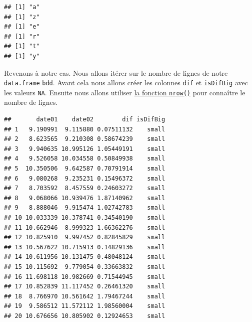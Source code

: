\documentclass[]{book}
\newenvironment{Shaded}{\begin{snugshade}}{\end{snugshade}}
\newcommand{\ControlFlowTok}[1]{\textcolor[rgb]{0.13,0.29,0.53}{\textbf{#1}}}
\newcommand{\DataTypeTok}[1]{\textcolor[rgb]{0.13,0.29,0.53}{#1}}
\newcommand{\DecValTok}[1]{\textcolor[rgb]{0.00,0.00,0.81}{#1}}
\newcommand{\KeywordTok}[1]{\textcolor[rgb]{0.13,0.29,0.53}{\textbf{#1}}}
\newcommand{\NormalTok}[1]{#1}
\newcommand{\OperatorTok}[1]{\textcolor[rgb]{0.81,0.36,0.00}{\textbf{#1}}}
\newcommand{\OtherTok}[1]{\textcolor[rgb]{0.56,0.35,0.01}{#1}}
\newcommand{\StringTok}[1]{\textcolor[rgb]{0.31,0.60,0.02}{#1}}
\begin{document}
\begin{verbatim}
## [1] "a"
## [1] "z"
## [1] "e"
## [1] "r"
## [1] "t"
## [1] "y"
\end{verbatim}

Revenons à notre cas. Nous allons itérer sur le nombre de lignes de notre \texttt{data.frame} \texttt{bdd}. Avant cela nous allons créer les colonnes \texttt{dif} et \texttt{isDifBig} avec les valeurs \texttt{NA}. Ensuite nous allons utiliser \protect\hyperlink{l015nrow}{la fonction \texttt{nrow()}} pour connaître le nombre de lignes.

\begin{Shaded}
\end{Shaded}

\begin{verbatim}
##       date01    date02        dif isDifBig
## 1   9.190991  9.115880 0.07511132    small
## 2   8.623565  9.210308 0.58674239    small
## 3   9.940635 10.995126 1.05449191    small
## 4   9.526058 10.034558 0.50849938    small
## 5  10.350506  9.642587 0.70791914    small
## 6   9.080268  9.235231 0.15496372    small
## 7   8.703592  8.457559 0.24603272    small
## 8   9.068066 10.939476 1.87140962    small
## 9   8.888046  9.915474 1.02742783    small
## 10 10.033339 10.378741 0.34540190    small
## 11 10.662946  8.999323 1.66362276    small
## 12 10.825910  9.997452 0.82845829    small
## 13 10.567622 10.715913 0.14829136    small
## 14 10.611956 10.131475 0.48048124    small
## 15 10.115692  9.779054 0.33663832    small
## 16 11.698118 10.982669 0.71544945    small
## 17 10.852839 11.117452 0.26461320    small
## 18  8.766970 10.561642 1.79467244    small
## 19  9.586512 11.572112 1.98560004    small
## 20 10.676656 10.805902 0.12924653    small
\end{verbatim}
\end{document}
